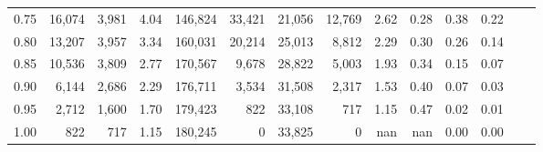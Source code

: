 \begin{tabular}{rrrrrrrrrrrrrr}
0.75 &  16,074 &  3,981 &    4.04 &  146,824 &   33,421 &  21,056 &  12,769 &  2.62 &  0.28 &  0.38 &      0.22 \\
0.80 &  13,207 &  3,957 &    3.34 &  160,031 &   20,214 &  25,013 &   8,812 &  2.29 &  0.30 &  0.26 &      0.14 \\
0.85 &  10,536 &  3,809 &    2.77 &  170,567 &    9,678 &  28,822 &   5,003 &  1.93 &  0.34 &  0.15 &      0.07 \\
0.90 &   6,144 &  2,686 &    2.29 &  176,711 &    3,534 &  31,508 &   2,317 &  1.53 &  0.40 &  0.07 &      0.03 \\
0.95 &   2,712 &  1,600 &    1.70 &  179,423 &      822 &  33,108 &     717 &  1.15 &  0.47 &  0.02 &      0.01 \\
1.00 &     822 &    717 &    1.15 &  180,245 &        0 &  33,825 &       0 &   nan &   nan &  0.00 &      0.00 \\
\bottomrule
\end{tabular}

